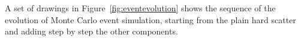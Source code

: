 A set of drawings in Figure~\ref{fig:eventevolution} shows the sequence
of the evolution of Monte Carlo event simulation, starting from the
plain hard scatter and adding step by step the other components.


